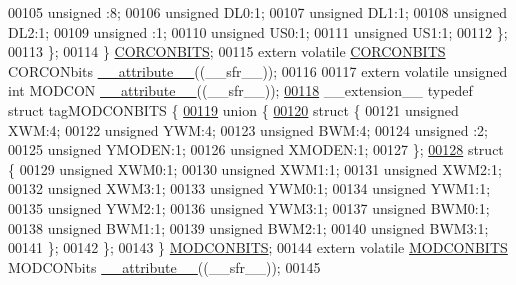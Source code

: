 \begin{DoxyCode}
00105       \textcolor{keywordtype}{unsigned} :8;
00106       \textcolor{keywordtype}{unsigned} DL0:1;
00107       \textcolor{keywordtype}{unsigned} DL1:1;
00108       \textcolor{keywordtype}{unsigned} DL2:1;
00109       \textcolor{keywordtype}{unsigned} :1;
00110       \textcolor{keywordtype}{unsigned} US0:1;
00111       \textcolor{keywordtype}{unsigned} US1:1;
00112     \};
00113   \};
00114 \} \hyperlink{a00008_df/d03/a00348}{CORCONBITS};
00115 \textcolor{keyword}{extern} \textcolor{keyword}{volatile} \hyperlink{a00008_df/d03/a00348}{CORCONBITS} CORCONbits \hyperlink{a00009_a493c46f03454991ccc5aa7a6e1dfb2a7}{\_\_attribute\_\_}((\_\_sfr\_\_));
00116 
00117 \textcolor{keyword}{extern} \textcolor{keyword}{volatile} \textcolor{keywordtype}{unsigned} \textcolor{keywordtype}{int}  MODCON \hyperlink{a00009_a493c46f03454991ccc5aa7a6e1dfb2a7}{\_\_attribute\_\_}((\_\_sfr\_\_));
\hypertarget{a00009_source_l00118}{}\hyperlink{a00008}{00118} \_\_extension\_\_ \textcolor{keyword}{typedef} \textcolor{keyword}{struct }tagMODCONBITS \{
\hypertarget{a00009_source_l00119}{}\hyperlink{a00009}{00119}   \textcolor{keyword}{union }\{
\hypertarget{a00009_source_l00120}{}\hyperlink{a00009}{00120}     \textcolor{keyword}{struct }\{
00121       \textcolor{keywordtype}{unsigned} XWM:4;
00122       \textcolor{keywordtype}{unsigned} YWM:4;
00123       \textcolor{keywordtype}{unsigned} BWM:4;
00124       \textcolor{keywordtype}{unsigned} :2;
00125       \textcolor{keywordtype}{unsigned} YMODEN:1;
00126       \textcolor{keywordtype}{unsigned} XMODEN:1;
00127     \};
\hypertarget{a00009_source_l00128}{}\hyperlink{a00009}{00128}     \textcolor{keyword}{struct }\{
00129       \textcolor{keywordtype}{unsigned} XWM0:1;
00130       \textcolor{keywordtype}{unsigned} XWM1:1;
00131       \textcolor{keywordtype}{unsigned} XWM2:1;
00132       \textcolor{keywordtype}{unsigned} XWM3:1;
00133       \textcolor{keywordtype}{unsigned} YWM0:1;
00134       \textcolor{keywordtype}{unsigned} YWM1:1;
00135       \textcolor{keywordtype}{unsigned} YWM2:1;
00136       \textcolor{keywordtype}{unsigned} YWM3:1;
00137       \textcolor{keywordtype}{unsigned} BWM0:1;
00138       \textcolor{keywordtype}{unsigned} BWM1:1;
00139       \textcolor{keywordtype}{unsigned} BWM2:1;
00140       \textcolor{keywordtype}{unsigned} BWM3:1;
00141     \};
00142   \};
00143 \} \hyperlink{a00008_d0/dec/a00592}{MODCONBITS};
00144 \textcolor{keyword}{extern} \textcolor{keyword}{volatile} \hyperlink{a00008_d0/dec/a00592}{MODCONBITS} MODCONbits \hyperlink{a00009_a493c46f03454991ccc5aa7a6e1dfb2a7}{\_\_attribute\_\_}((\_\_sfr\_\_));
00145 

\end{DoxyCode}
